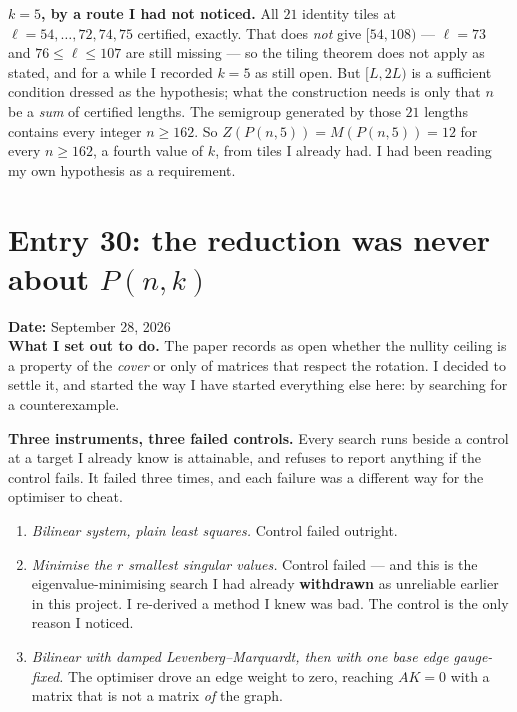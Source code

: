 \documentclass[12pt]{article}
\begin{document}
\textbf{$k=5$, by a route I had not noticed.} All $21$ identity tiles at
$\ell=54,\dots,72,74,75$ certified, exactly. That does \emph{not} give
$[54,108)$ --- $\ell=73$ and $76\le\ell\le107$ are still missing --- so
the tiling theorem does not apply as stated, and for a while I recorded
$k=5$ as still open. But $[L,2L)$ is a sufficient condition dressed as the
hypothesis; what the construction needs is only that $n$ be a \emph{sum} of
certified lengths. The semigroup generated by those $21$ lengths contains every
integer $n\ge162$. So $Z(P(n,5))=M(P(n,5))=12$ for every $n\ge162$, a fourth
value of $k$, from tiles I already had. I had been reading my own hypothesis as
a requirement.


\clearpage
\section*{Entry 30: the reduction was never about $P(n,k)$}
\textbf{Date:} September 28, 2026\\

\textbf{What I set out to do.} The paper records as open whether the nullity
ceiling is a property of the \emph{cover} or only of matrices that respect the
rotation. I decided to settle it, and started the way I have started everything
else here: by searching for a counterexample.

\textbf{Three instruments, three failed controls.} Every search runs beside a
control at a target I already know is attainable, and refuses to report anything
if the control fails. It failed three times, and each failure was a different
way for the optimiser to cheat.

\begin{enumerate}
\item \emph{Bilinear system, plain least squares.} Control failed outright.
\item \emph{Minimise the $r$ smallest singular values.} Control failed --- and
this is the eigenvalue-minimising search I had already \textbf{withdrawn} as
unreliable earlier in this project. I re-derived a method I knew was bad. The
control is the only reason I noticed.
\item \emph{Bilinear with damped Levenberg--Marquardt, then with one base edge
gauge-fixed.} The optimiser drove an edge weight to zero, reaching $AK=0$ with a
matrix that is not a matrix \emph{of} the graph.
\end{enumerate}
\end{document}
